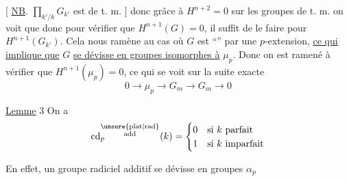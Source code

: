 [ \uline{NB}. $\prod_{k'/k}G_{k'}$ est de t. m. ] donc grâce à $H^{n+2}=0$ sur les groupes de t. m. on voit que
donc pour vérifier que $H^{n+1}(G)=0$, il suffit de le faire pour $H^{n+1}(G_{k'})$. Cela nous ramène au cas où $G$ est ``'' par une $p$-extension, \uline{ce qui implique que} $G$ \uline{se dévisse en groupes isomorphes à} $\mu_p$. Donc on est ramené à vérifier que $H^{n+1}(\mu_p)=0$, ce qui se voit sur la suite exacte
\[
0\longrightarrow\mu_p\longrightarrow G_m\longrightarrow G_m\longrightarrow 0
\]

\uline{Lemme} 3  On a
\[
\operatorname{cd}^{\substack{\rm \unsure{plat|rad}\\\rm add}}_p(k)=
\begin{cases}0&\text{si }k\text{ parfait}\\1&\text{si }k\text{ imparfait}\end{cases}
\]

En effet, un groupe radiciel additif se dévisse en groupes $\alpha_p$ 

